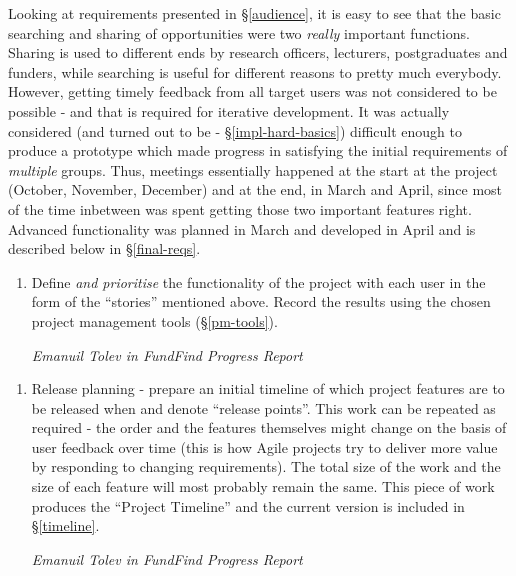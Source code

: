 Looking at requirements presented in \S\ref{audience}, it is easy to see that the basic searching and sharing of opportunities were two \emph{really} important functions. Sharing is used to different ends by research officers, lecturers, postgraduates and funders, while searching is useful for different reasons to pretty much everybody. However, getting timely feedback from all target users was not considered to be possible - and that is required for iterative development. It was actually considered (and turned out to be - \S\ref{impl-hard-basics}) difficult enough to produce a prototype which made progress in satisfying the initial requirements of \emph{multiple} groups. Thus, meetings essentially happened at the start at the project (October, November, December) and at the end, in March and April, since most of the time inbetween was spent getting those two important features right. Advanced functionality was planned in March and developed in April and is described below in \S\ref{final-reqs}.

\begin{shadequote}
\begin{enumerate}
	\setcounter{enumi}{\thetmpc}
	\item Define \emph{and prioritise} the functionality of the project with each user in the form of the ``stories'' mentioned above. Record the results using the chosen project management tools (\S\ref{pm-tools}).
	\par\emph{Emanuil Tolev in FundFind Progress Report \cite{progress-report}}
	\setcounter{tmpc}{\theenumi}
\end{enumerate}
\end{shadequote}


\begin{shadequote}
\begin{enumerate}
	\setcounter{enumi}{\thetmpc}
	\item Release planning - prepare an initial timeline of which project features are to be released when and denote ``release points''. This work can be repeated as required - the order and the features themselves might change on the basis of user feedback over time (this is how Agile projects try to deliver more value by responding to changing requirements). The total size of the work and the size of each feature will most probably remain the same. This piece of work produces the ``Project Timeline'' and the current version is included in \S\ref{timeline}.
	\par\emph{Emanuil Tolev in FundFind Progress Report \cite{progress-report}}
	\setcounter{tmpc}{\theenumi}
\end{enumerate}
\end{shadequote}


